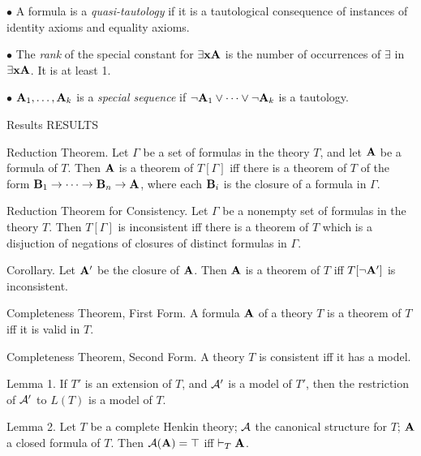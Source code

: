 \item{$\bullet$} A formula is a {\it quasi-tautology} if it is a tautological
consequence of instances of identity axioms and equality axioms.

\item{$\bullet$} The {\it rank} of the special constant for $\exists{\bf x}{\bf A}$ is the
number of occurrences of $\exists$ in $\exists{\bf x}{\bf A}$. It is at least 1.

\item{$\bullet$} ${\bf A}_1,\dots,{\bf A}_k$ is a {\it special sequence} if 
$\neg{\bf A}_1 \lor \cdots \lor \neg{\bf A}_k$ is a tautology.

 {Results}
\beginsection RESULTS


\proclaim Reduction Theorem. Let $\Gamma$ be a set of formulas in the theory $T$, and
let ${\bf A}$ be a formula of $T$. Then ${\bf A}$ is a theorem of $T[\Gamma]$ iff there is a
theorem of $T$ of the form ${\bf B}_1 \to \cdots \to {\bf B}_n \to {\bf A}$, where each ${\bf B}_i$ is
the closure of a formula in $\Gamma$.

\proclaim Reduction Theorem for Consistency. Let $\Gamma$ be a nonempty set of
formulas in the theory $T$. Then $T[\Gamma]$ is inconsistent iff there is a theorem
of $T$ which is a disjuction of negations of closures of distinct formulas in $\Gamma$.

\proclaim Corollary. Let ${\bf A}'$ be the closure of ${\bf A}$. Then ${\bf A}$ is a theorem of $T$
iff $T[\neg {\bf A}']$ is inconsistent.


\proclaim Completeness Theorem, First Form. A formula ${\bf A}$ of a theory $T$ is a theorem
of $T$ iff it is valid in $T$.

\proclaim Completeness Theorem, Second Form. A theory $T$ is consistent iff it has a model.

\proclaim Lemma 1. If $T'$ is an extension of $T$, and ${\cal A}'$ is a model of $T'$,
then the restriction of ${\cal A}'$ to $L(T)$ is a model of $T$.

\proclaim Lemma 2. Let $T$ be a complete Henkin theory; ${\cal A}$ the canonical
structure for $T$; ${\bf A}$ a closed formula of $T$. Then ${\cal A}({\bf A}) = \top$ iff
$\vdash_T {\bf A}$.

